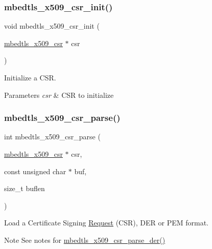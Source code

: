 \subsubsection{\texorpdfstring{mbedtls\+\_\+x509\+\_\+csr\+\_\+init()}{mbedtls\_x509\_csr\_init()}}
{\footnotesize\ttfamily void mbedtls\+\_\+x509\+\_\+csr\+\_\+init (\begin{DoxyParamCaption}\item[{\mbox{\hyperlink{structmbedtls__x509__csr}{mbedtls\+\_\+x509\+\_\+csr}} $\ast$}]{csr }\end{DoxyParamCaption})}



Initialize a C\+SR. 


\begin{DoxyParams}{Parameters}
{\em csr} & C\+SR to initialize \\
\hline
\end{DoxyParams}
\mbox{\label{group__x509__module_ga53012fb8859f4835ccfb0a5e359b3176}} 
\subsubsection{\texorpdfstring{mbedtls\+\_\+x509\+\_\+csr\+\_\+parse()}{mbedtls\_x509\_csr\_parse()}}
{\footnotesize\ttfamily int mbedtls\+\_\+x509\+\_\+csr\+\_\+parse (\begin{DoxyParamCaption}\item[{\mbox{\hyperlink{structmbedtls__x509__csr}{mbedtls\+\_\+x509\+\_\+csr}} $\ast$}]{csr,  }\item[{const unsigned char $\ast$}]{buf,  }\item[{size\+\_\+t}]{buflen }\end{DoxyParamCaption})}



Load a Certificate Signing \mbox{\hyperlink{struct_request}{Request}} (C\+SR), D\+ER or P\+EM format. 

\begin{DoxyNote}{Note}
See notes for {\ttfamily \mbox{\hyperlink{group__x509__module_ga4c58fa3804ea9feb1acf745221f17208}{mbedtls\+\_\+x509\+\_\+csr\+\_\+parse\+\_\+der()}}} 
\end{DoxyNote}

